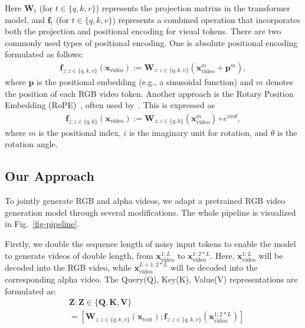 Here \( \mathbf{W}_{t} \) (for \( t \in \{q, k, v\} \)) represents the projection matrixs in the transformer model, and \( \mathbf{f}_{t} \) (for \( t \in \{q, k, v\} \)) represents a combined operation that incorporates both the projection and positional encoding for visual tokens. 
There are two commonly used types of positional encoding. One is absolute positional encoding formulated as follows:
\begin{equation}
\begin{aligned}
\mathbf{f}_{z : z \in \{q, k, v\}}(\mathbf{x}_{\text{video}}) := \mathbf{W}_{z : z \in \{q, k, v\}}(\mathbf{x}_{\text{video}}^m + \mathbf{p}^m),
\end{aligned}
\label{PE}
\end{equation}
where \( \mathbf{p} \) is the positional embedding (e.g., a sinusoidal function) and \( m \) denotes the position of each RGB video token.
Another approach is the Rotary Position Embedding (RoPE)~\cite{su2024roformer}, often used by~\cite{yang2024cogvideox, genmo2024mochi}. 
This is expressed as
\begin{equation}
\begin{aligned}
\mathbf{f}_{z : z \in \{q, k\}}(\mathbf{x}_{\text{video}}) := \mathbf{W}_{z : z \in \{q, k\}}(\mathbf{x}_{\text{video}}^m) \circ e^{im\theta},
\end{aligned}
\label{RoPE}
\end{equation}
where \( m \) is the positional index, \( i \) is the imaginary unit for rotation, and \( \theta \) is the rotation angle.




\subsection{Our Approach} 
To jointly generate RGB and alpha videos, we adapt a pretrained RGB video generation model through several modifications. The whole pipeline is visualized in Fig.~\ref{fig-pipeline}.

Firstly, we double the sequence length of noisy input tokens to enable the model to generate videos of double length, from \( \mathbf{x}^{1:L}_{\text{video}} \) to \( \mathbf{x}^{1:2*L}_{\text{video}} \). 
Here, \( \mathbf{x}^{1:L}_{\text{video}} \) will be decoded into the RGB video, while \( \mathbf{x}^{L+1:2*L}_{\text{video}} \) will be decoded into the corresponding alpha video.
The Query(Q), Key(K), Value(V) representations are formulated as:
\begin{equation}
\begin{aligned}
&\mathbf{Z : Z \in \{Q, K, V\}} \\&= [\mathbf{W}_{z : z \in \{q, k, v\}}(\mathbf{x}_{\text{text}}); \mathbf{f}_{z : z \in \{q, k, v\}}(\mathbf{x}^{1:2*L}_{\text{video}})]
\end{aligned}
\end{equation}

